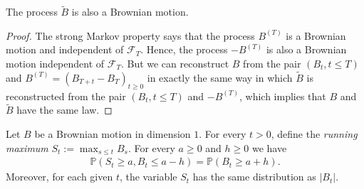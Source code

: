 \documentclass[../mainfile.tex]{subfiles}
\begin{document}
\begin{prop} The process $\tilde{B}$ is also a Brownian motion. 
\end{prop}
\begin{proof}
The strong Markov property says that the process $B^{(T)}$ is a Brownian motion and independent of $\mathcal{F}_T$. Hence, the process $-B^{(T)}$ is also a Brownian motion independent of $\mathcal{F}_T$. But we can reconstruct $B$ from the pair $(B_t, t \leq T)$ and $B^{(T)}=(B_{T+t}-B_T)_{t \geq 0 }$ in exactly the same way in which $\tilde{B}$ is reconstructed from the pair $(B_t, t \leq T)$ and $-B^{(T)}$, which implies that $B$ and $\tilde{B}$ have the same law. 
\end{proof}
\newpage
\begin{cor} Let $B$ be a Brownian motion in dimension $1$. For every $t>0$, define the \textit{running maximum} $S_t:= \max_{s \leq t} B_s$. For every $a \geq 0$ and $h \geq 0$ we have 
\begin{align*}
\mathbb{P}(S_t \geq a , B_t \leq a-h ) = \mathbb{P}(B_t \geq a+h).
\end{align*} 
Moreover, for each given $t$, the variable $S_t$ has the same distribution as $|B_t|$. 
\end{cor}
\end{document}
